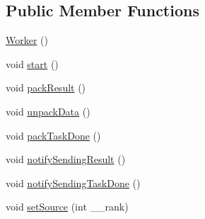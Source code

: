 \subsection*{Public Member Functions}
\begin{CompactItemize}
\item 
\hypertarget{classWorker_3754817df06ffe220f7f0d903c78ccac}{
\hyperlink{classWorker_3754817df06ffe220f7f0d903c78ccac}{Worker} ()}
\label{classWorker_3754817df06ffe220f7f0d903c78ccac}

\item 
\hypertarget{classWorker_abcbbace05c6113f1959c494b3577291}{
void \hyperlink{classWorker_abcbbace05c6113f1959c494b3577291}{start} ()}
\label{classWorker_abcbbace05c6113f1959c494b3577291}

\item 
\hypertarget{classWorker_83780920118e6c2b67d9477bdf8be248}{
void \hyperlink{classWorker_83780920118e6c2b67d9477bdf8be248}{pack\-Result} ()}
\label{classWorker_83780920118e6c2b67d9477bdf8be248}

\item 
\hypertarget{classWorker_bff2bdcd64fe5400156cc78704c64953}{
void \hyperlink{classWorker_bff2bdcd64fe5400156cc78704c64953}{unpack\-Data} ()}
\label{classWorker_bff2bdcd64fe5400156cc78704c64953}

\item 
\hypertarget{classWorker_60d2e8eba85b9ef403d94be54c391640}{
void \hyperlink{classWorker_60d2e8eba85b9ef403d94be54c391640}{pack\-Task\-Done} ()}
\label{classWorker_60d2e8eba85b9ef403d94be54c391640}

\item 
\hypertarget{classWorker_e2f487014766a73c5788bdcfd58ad863}{
void \hyperlink{classWorker_e2f487014766a73c5788bdcfd58ad863}{notify\-Sending\-Result} ()}
\label{classWorker_e2f487014766a73c5788bdcfd58ad863}

\item 
\hypertarget{classWorker_13efd6a8e275745329a4a8e23a0eb0bb}{
void \hyperlink{classWorker_13efd6a8e275745329a4a8e23a0eb0bb}{notify\-Sending\-Task\-Done} ()}
\label{classWorker_13efd6a8e275745329a4a8e23a0eb0bb}

\item 
\hypertarget{classWorker_5dab4ea663546b5a49d9398d7a624d27}{
void \hyperlink{classWorker_5dab4ea663546b5a49d9398d7a624d27}{set\-Source} (int \_\-\_\-rank)}
\label{classWorker_5dab4ea663546b5a49d9398d7a624d27}

\end{CompactItemize}
